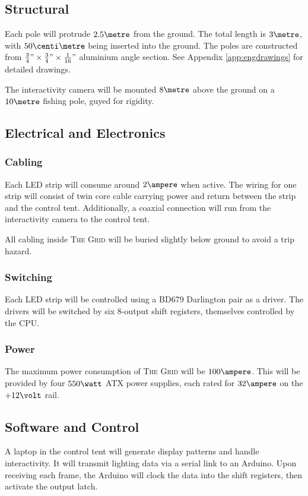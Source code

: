 \documentclass[12pt]{article} %
\begin{document}
\subsection{Structural}
Each pole will protrude $2.5\metre$ from the ground.  The total length is $3\metre$, with $50\centi\metre$ being inserted into the ground.  The poles are constructed from $\frac{3}{4}" \times \frac{3}{4}" \times \frac{1}{16}"$ aluminium angle section.  See Appendix \ref{app:engdrawings} for detailed drawings.

The interactivity camera will be mounted $8\metre$ above the ground on a $10\metre$ fishing pole, guyed for rigidity.

\subsection{Electrical and Electronics}
\subsubsection{Cabling}
Each LED strip will consume around $2\ampere$ when active.  The wiring for one strip will consist of twin core cable carrying power and return between the strip and the control tent.  Additionally, a coaxial connection will run from the interactivity camera to the control tent.

All cabling inside \textsc{The Grid} will be buried slightly below ground to avoid a trip hazard.

\subsubsection{Switching}
Each LED strip will be controlled using a BD679 Darlington pair as a driver.  The drivers will be switched by six 8-output shift registers, themselves controlled by the CPU.

\subsubsection{Power}
The maximum power consumption of \textsc{The Grid} will be $100\ampere$.  This will be provided by four $550\watt$ ATX power supplies, each rated for $32\ampere$ on the $+12\volt$ rail.

\subsection{Software and Control}
A laptop in the control tent will generate display patterns and handle interactivity.  It will transmit lighting data via a serial link to an Arduino.  Upon receiving each frame, the Arduino will clock the data into the shift registers, then activate the output latch.
\end{document}
